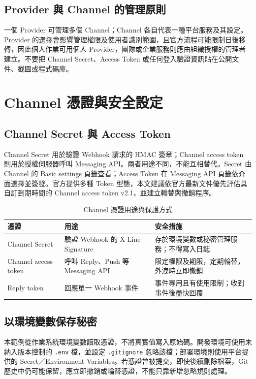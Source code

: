 \documentclass[12pt,a4paper]{report}
\begin{document}
\section{Provider 與 Channel 的管理原則}
一個 Provider 可管理多個 Channel；Channel 各自代表一種平台服務及其設定。Provider 的選擇會影響管理權限及使用者識別範圍，且官方流程可能限制日後移轉，因此個人作業可用個人 Provider，團隊或企業服務則應由組織授權的管理者建立。不要把 Channel Secret、Access Token 或任何登入驗證資訊貼在公開文件、截圖或程式碼庫。

\chapter{Channel 憑證與安全設定}
\section{Channel Secret 與 Access Token}
Channel Secret 用於驗證 Webhook 請求的 HMAC 簽章；Channel access token 則用於授權伺服器呼叫 Messaging API。兩者用途不同，不能互相替代。Secret 由 Channel 的 Basic settings 頁籤查看；Access Token 在 Messaging API 頁籤依介面選擇並簽發。官方提供多種 Token 型態，本文建議依官方最新文件優先評估具自訂到期時間的 Channel access token v2.1，並建立輪替與撤銷程序。

\begin{table}[htbp]
\centering
\caption{Channel 憑證用途與保護方式}
\label{tab:credentials}
\begin{tabularx}{\textwidth}{>{\raggedright\arraybackslash}p{3.2cm} X X}
\toprule
憑證 & 用途 & 安全措施 \\
\midrule
Channel Secret & 驗證 Webhook 的 X-Line-Signature & 存於環境變數或秘密管理服務；不得寫入日誌 \\
Channel access token & 呼叫 Reply、Push 等 Messaging API & 限定權限及期限，定期輪替，外洩時立即撤銷 \\
Reply token & 回應單一 Webhook 事件 & 事件專用且有使用限制；收到事件後盡快回覆 \\
\bottomrule
\end{tabularx}
\end{table}

\section{以環境變數保存秘密}
本範例從作業系統環境變數讀取憑證，不將真實值寫入原始碼。開發環境可使用未納入版本控制的 \texttt{.env} 檔，並設定 \texttt{.gitignore} 忽略該檔；部署環境則使用平台提供的 Secret／Environment Variables。若憑證曾被提交，即使後續刪除檔案，Git 歷史中仍可能保留，應立即撤銷或輪替憑證，不能只靠新增忽略規則處理。
\end{document}
